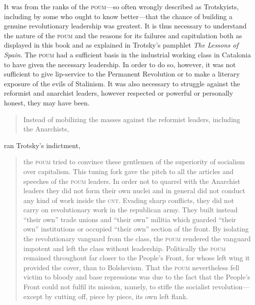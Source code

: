 It was from the ranks of the \textsc{poum}---so often wrongly described as Trotskyists, including by some who ought to know better---that the chance of building a genuine revolutionary leadership was greatest. It is thus necessary to understand the nature of the \textsc{poum} and the reasons for its failures and capitulation both as displayed in this book and as explained in Trotsky’s pamphlet \emph{The Lessons of Spain}. The \textsc{poum} had a sufficient basis in the industrial working class in Catalonia to have given the necessary leadership. In order to do so, however, it was not sufficient to give lip-service to the Permanent Revolution or to make a literary exposure of the evils of Stalinism. It was also necessary to struggle against the reformist and anarchist leaders, however respected or powerful or personally honest, they may have been.
\begin{quotation}
 Instead of mobilizing the masses against the reformist leaders, including the Anarchists,
\end{quotation}
ran Trotsky’s indictment,
\begin{quote}
  the \textsc{poum} tried to convince these gentlemen of the superiority of socialism over capitalism. This tuning fork gave the pitch to all the articles and speeches of the \textsc{poum} leaders. In order not to quarrel with the Anarchist leaders they did not form their own nuclei and in general did not conduct any kind of work inside the \textsc{cnt}. Evading sharp conflicts, they did not carry on revolutionary work in the republican army. They built instead ``their own'' trade unions and ``their own'' militia which guarded ``their own'' institutions or occupied ``their own'' section of the front. By isolating the revolutionary vanguard from the class, the \textsc{poum} rendered the vanguard impotent and left the class without leadership. Politically the \textsc{poum} remained throughout far closer to the People’s Front, for whose left wing it provided the cover, than to Bolshevism. That the \textsc{poum} nevertheless fell victim to bloody and base repressions was due to the fact that the People’s Front could not fulfil its mission, namely, to stifle the socialist revolution---except by cutting off, piece by piece, its own left flank.
\end{quote}

